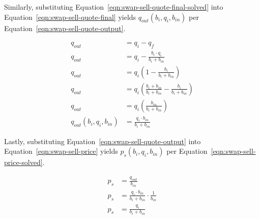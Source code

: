 \documentclass[table, twocolumn]{article}
\begin{document}
Similarly, substituting Equation~\ref{eqn:swap-sell-quote-final-solved} into
Equation~\ref{eqn:swap-sell-quote-final} yields $q_{out}(b_i, q_i, b_{in})$
per Equation~\ref{eqn:swap-sell-quote-output}.

\begin{align}\label{eqn:swap-sell-quote-output}
	q_{out}                    & = q_i - q_f \nonumber                                \\
	q_{out}                    & = q_i - \frac{b_i \cdot q_i}{b_i + b_{in}} \nonumber \\
	q_{out}                    & =
	q_i \left( 1 - \frac{b_i}{b_i + b_{in}} \right) \nonumber                         \\
	q_{out}                    & = q_i \left(
	\frac{b_i + b_{in}}{b_i + b_{in}} - \frac{b_i}{b_i + b_{in}}
	\right) \nonumber                                                                 \\
	q_{out}                    & =
	q_i \left( \frac{b_{in}}{b_i + b_{in}} \right) \nonumber                          \\
	q_{out} (b_i, q_i, b_{in}) & = \frac{q_i \cdot b_{in}}{b_i + b_{in}}
\end{align}

Lastly, substituting Equation~\ref{eqn:swap-sell-quote-output} into
Equation~\ref{eqn:swap-sell-price} yields $p_s(b_i, q_i, b_{in})$ per
Equation~\ref{eqn:swap-sell-price-solved}.

\begin{align}\label{eqn:swap-sell-price-solved}
	p_s & = \frac{q_{out}}{b_{in}} \nonumber                                       \\
	p_s & = \frac{q_i \cdot b_{in}}{b_i + b_{in}} \cdot \frac{1}{b_{in}} \nonumber \\
	p_s & = \frac{q_i}{b_i + b_{in}}
\end{align}
\end{document}
